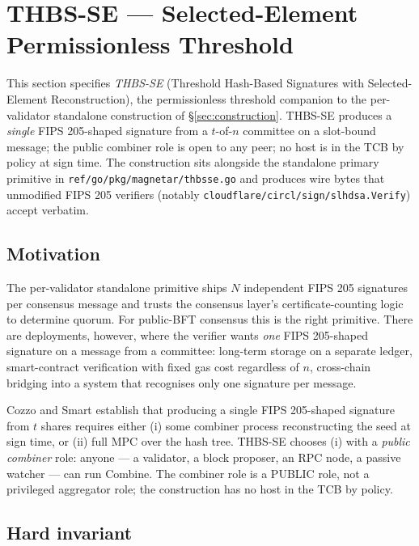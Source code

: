 \section{THBS-SE --- Selected-Element Permissionless Threshold}
\label{sec:thbsse}

This section specifies \emph{THBS-SE} (Threshold Hash-Based
Signatures with Selected-Element Reconstruction), the
permissionless threshold companion to the per-validator standalone
construction of \S\ref{sec:construction}. THBS-SE produces a
\emph{single} FIPS 205-shaped signature from a $t$-of-$n$ committee
on a slot-bound message; the public combiner role is open to any
peer; no host is in the TCB by policy at sign time. The construction
sits alongside the standalone primary primitive in
\texttt{ref/go/pkg/magnetar/thbsse.go} and produces wire bytes that
unmodified FIPS 205 verifiers (notably
\texttt{cloudflare/circl/sign/slhdsa.Verify}) accept verbatim.

\subsection{Motivation}
\label{sec:thbsse:motivation}

The per-validator standalone primitive ships $N$ independent
FIPS 205 signatures per consensus message and trusts the consensus
layer's certificate-counting logic to determine quorum. For
public-BFT consensus this is the right primitive. There are
deployments, however, where the verifier wants \emph{one} FIPS
205-shaped signature on a message from a committee: long-term
storage on a separate ledger, smart-contract verification with
fixed gas cost regardless of $n$, cross-chain bridging into a
system that recognises only one signature per message.

Cozzo and Smart \cite{cosmin2021} establish that producing a
single FIPS 205-shaped signature from $t$ shares requires either
(i) some combiner process reconstructing the seed at sign time, or
(ii) full MPC over the hash tree. THBS-SE chooses (i) with a
\emph{public combiner} role: anyone --- a validator, a block
proposer, an RPC node, a passive watcher --- can run Combine. The
combiner role is a PUBLIC role, not a privileged aggregator role;
the construction has no host in the TCB by policy.

\subsection{Hard invariant}
\label{sec:thbsse:invariant}

